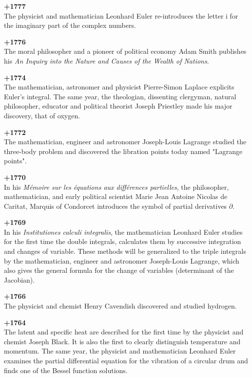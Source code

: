 \textbf{+1777}\\
The physicist and mathematician Leonhard Euler re-introduces the letter $\mathrm{i}$ for the imaginary part of the complex numbers.

\textbf{+1776}\\
The moral philosopher and a pioneer of political economy Adam Smith publishes his \textit{An Inquiry into the Nature and Causes of the Wealth of Nations}.

\textbf{+1774}\\
The mathematician, astronomer and physicist Pierre-Simon Laplace explicits Euler's integral. The same year, the theologian, dissenting clergyman, natural philosopher, educator and political theorist Joseph Priestley made his major discovery, that of oxygen.

\textbf{+1772}\\
The mathematician, engineer and astronomer Joseph-Louis Lagrange studied the three-body problem and discovered the libration points today named "Lagrange points".

\textbf{+1770}\\
In his \textit{Mémoire sur les équations aux différences partielles}, the philosopher, mathematician, and early political scientist Marie Jean Antoine Nicolas de Caritat, Marquis of Condorcet introduces the symbol of partial derivatives $\partial$.

\textbf{+1769}\\
In his \textit{Institutiones calculi integralis}, the mathematician Leonhard Euler studies for the first time the double integrals, calculates them by successive integration and changes of variable. These methods will be generalized to the triple integrals by the mathematician, engineer and astronomer Joseph-Louis Lagrange, which also gives the general formula for the change of variables (determinant of the Jacobian).

\textbf{+1766}\\
The physicist and chemist Henry Cavendish discovered and studied hydrogen.

\textbf{+1764}\\
The latent and specific heat are described for the first time by the physicist and chemist Joseph Black. It is also the first to clearly distinguish temperature and momentum. The same year, the physicist and mathematician Leonhard Euler examines the partial differential equation for the vibration of a circular drum and finds one of the Bessel function solutions.


